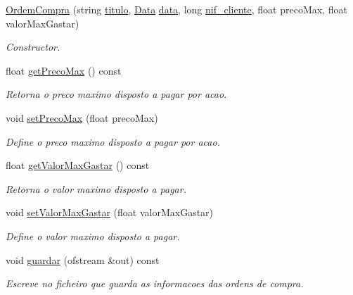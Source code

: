 \begin{DoxyCompactItemize}
\item 
\hyperlink{class_ordem_compra_a98bff4c9185593d197e72a7f14e5856f}{Ordem\+Compra} (string \hyperlink{class_ordem_a0773861bd9fb956d5ec62f2ef1de658b}{titulo}, \hyperlink{class_data}{Data} \hyperlink{class_ordem_a9f4dbc2966e98dcbd7e300ae346d8535}{data}, long \hyperlink{class_ordem_af6d06b4250735ae531bdcef5fa332f02}{nif\+\_\+cliente}, float preco\+Max, float valor\+Max\+Gastar)
\begin{DoxyCompactList}\small\item\em Constructor. \end{DoxyCompactList}\item 
float \hyperlink{class_ordem_compra_a2c4117480fead3d38c34e7491007503d}{get\+Preco\+Max} () const
\begin{DoxyCompactList}\small\item\em Retorna o preco maximo disposto a pagar por acao. \end{DoxyCompactList}\item 
void \hyperlink{class_ordem_compra_aab6b393722db7f13fa0c37eddb1b4b04}{set\+Preco\+Max} (float preco\+Max)
\begin{DoxyCompactList}\small\item\em Define o preco maximo disposto a pagar por acao. \end{DoxyCompactList}\item 
float \hyperlink{class_ordem_compra_a29931277d9029de1cb8a176694f38085}{get\+Valor\+Max\+Gastar} () const
\begin{DoxyCompactList}\small\item\em Retorna o valor maximo disposto a pagar. \end{DoxyCompactList}\item 
void \hyperlink{class_ordem_compra_ada9283bb3eda59fd0f6b10aa7e2b86c2}{set\+Valor\+Max\+Gastar} (float valor\+Max\+Gastar)
\begin{DoxyCompactList}\small\item\em Define o valor maximo disposto a pagar. \end{DoxyCompactList}\item 
void \hyperlink{class_ordem_compra_ae4c663bb3b6d507fabc7d02fa244cd56}{guardar} (ofstream \&out) const
\begin{DoxyCompactList}\small\item\em Escreve no ficheiro que guarda as informacoes das ordens de compra. \end{DoxyCompactList}\end{DoxyCompactItemize}
